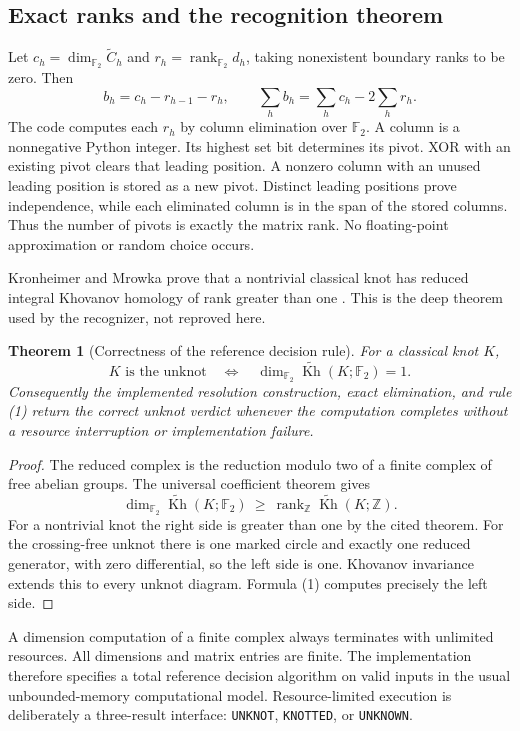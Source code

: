 \documentclass[11pt]{article}
\newtheorem{theorem}{Theorem}[section]
\theoremstyle{definition}
\newcommand{\F}{\mathbb F_2}
\newcommand{\Kh}{\widetilde{\operatorname{Kh}}}
\newcommand{\rank}{\operatorname{rank}}
\newcommand{\code}[1]{\texttt{#1}}
\begin{document}
\subsection{Exact ranks and the recognition theorem}
Let $c_h=\dim_{\F}\widetilde C_h$ and $r_h=\rank_{\F} d_h$, taking nonexistent
boundary ranks to be zero. Then
\[
 b_h=c_h-r_{h-1}-r_h,\qquad
 \sum_hb_h=\sum_hc_h-2\sum_hr_h.                 \tag{1}
\]
The code computes each $r_h$ by column elimination over $\F$. A column is a
nonnegative Python integer. Its highest set bit determines its pivot. XOR
with an existing pivot clears that leading position. A nonzero column with
an unused leading position is stored as a new pivot. Distinct leading
positions prove independence, while each eliminated column is in the span of
the stored columns. Thus the number of pivots is exactly the matrix rank.
No floating-point approximation or random choice occurs.

Kronheimer and Mrowka prove that a nontrivial classical knot has reduced
integral Khovanov homology of rank greater than one \cite{detector}. This is
the deep theorem used by the recognizer, not reproved here.

\begin{theorem}[Correctness of the reference decision rule]
For a classical knot $K$,
\[
 K\text{ is the unknot}\quad\Longleftrightarrow\quad
 \dim_{\F}\Kh(K;\F)=1.
\]
Consequently the implemented resolution construction, exact elimination, and
rule (1) return the correct unknot verdict whenever the computation completes
without a resource interruption or implementation failure.
\end{theorem}
\begin{proof}
The reduced complex is the reduction modulo two of a finite complex of free
abelian groups. The universal coefficient theorem gives
\[
 \dim_{\F}\Kh(K;\F)\ \geq\ \rank_{\mathbb Z}\Kh(K;\mathbb Z).
\]
For a nontrivial knot the right side is greater than one by the cited theorem.
For the crossing-free unknot there is one marked circle and exactly one
reduced generator, with zero differential, so the left side is one.
Khovanov invariance extends this to every unknot diagram. Formula (1)
computes precisely the left side.
\end{proof}
A dimension computation of a finite complex always terminates with unlimited
resources. All dimensions and matrix entries are finite. The implementation
therefore specifies a total reference decision algorithm on valid inputs in
the usual unbounded-memory computational model. Resource-limited execution
is deliberately a three-result interface: \code{UNKNOT}, \code{KNOTTED},
or \code{UNKNOWN}.
\end{document}
